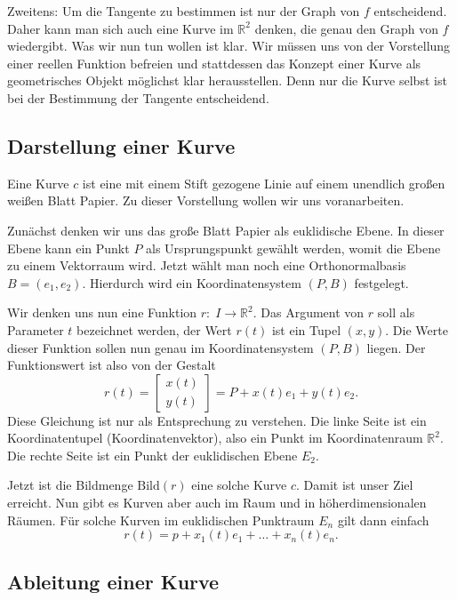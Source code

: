 \documentclass[a4paper,12pt,fleqn]{article}
\begin{document}
Zweitens: Um die Tangente zu bestimmen ist nur der Graph von \(f\)
entscheidend. Daher kann man sich auch eine Kurve im \(\mathbb R^2\)
denken, die genau den Graph von \(f\) wiedergibt. Was wir nun tun
wollen ist klar. Wir müssen uns von der Vorstellung einer reellen
Funktion befreien und stattdessen das Konzept einer Kurve als
geometrisches Objekt möglichst klar herausstellen. Denn nur die
Kurve selbst ist bei der Bestimmung der Tangente entscheidend.

\subsection{Darstellung einer Kurve}

Eine Kurve \(c\) ist eine mit einem Stift gezogene Linie auf einem
unendlich großen weißen Blatt Papier. Zu dieser Vorstellung wollen
wir uns voranarbeiten.

Zunächst denken wir uns das große Blatt Papier als euklidische
Ebene. In dieser Ebene kann ein Punkt \(P\) als Ursprungspunkt
gewählt werden, womit die Ebene zu einem Vektorraum wird.
Jetzt wählt man noch eine Orthonormalbasis \(B=(e_1,e_2)\).
Hierdurch wird ein Koordinatensystem \((P,B)\) festgelegt.

Wir denken uns nun eine Funktion \(r{:}\; I{\rightarrow}\mathbb R^2\).
Das Argument von \(r\) soll als Parameter \(t\) bezeichnet werden,
der Wert \(r(t)\) ist ein Tupel \((x,y)\). Die Werte dieser Funktion
sollen nun genau im Koordinatensystem \((P,B)\) liegen. Der
Funktionswert ist also von der Gestalt
\begin{equation}
r(t) = \begin{bmatrix}
x(t)\\ y(t)
\end{bmatrix}
= P+x(t)e_1+y(t)e_2.
\end{equation}
Diese Gleichung ist nur als Entsprechung zu verstehen. Die linke Seite
ist ein Koordinatentupel (Koordinatenvektor), also ein Punkt im
Koordinatenraum \(\mathbb R^2\). Die rechte Seite
ist ein Punkt der euklidischen Ebene \(E_2\).

Jetzt ist die Bildmenge \(\mathrm{Bild}(r)\) eine solche
Kurve \(c\). Damit ist unser Ziel erreicht. Nun gibt es Kurven
aber auch im Raum und in höherdimensionalen Räumen. Für solche
Kurven im euklidischen Punktraum \(E_n\) gilt dann einfach
\begin{equation}
r(t) = p+x_1(t)e_1+\ldots+x_n(t)e_n.
\end{equation}

\subsection{Ableitung einer Kurve}
\end{document}
